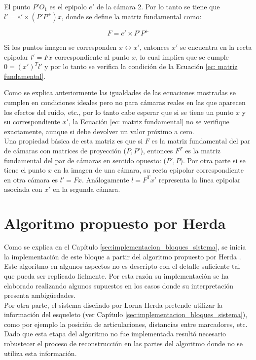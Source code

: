 El punto $P'O_1$ es el epipolo $e'$ de la cámara 2. Por lo tanto se tiene que\\$l' = e' \times (P'P^+) x$, donde se define la matriz fundamental como:

\begin{equation}
F=e' \times P'P^+
\end{equation}

Si los puntos imagen se corresponden $x \leftrightarrow x'$, entonces $x'$ se encuentra en la recta epipolar $l'=Fx$ correspondiente al punto $x$, lo cual implica que se cumple $0=(x')^Tl'$ y por lo tanto se verifica la condición de la Ecuación \ref{ec: matriz fundamental}. 

Como se explica anteriormente las igualdades de las ecuaciones mostradas se cumplen en condiciones ideales pero no para cámaras reales en las que aparecen los efectos del ruido, etc., por lo tanto cabe esperar que si se tiene un punto $x$ y su correspondiente $x'$, la Ecuación \ref{ec: matriz fundamental} no se verifique exactamente, aunque si debe devolver un valor próximo a cero.\\

Una propiedad básica de esta matriz es que si $F$ es la matriz fundamental del par de cámaras con matrices de proyección ($P,P'$), entonces $F^T$ es la matriz fundamental del par de cámaras en sentido opuesto: ($P',P$). Por otra parte si se tiene el punto $x$ en la imagen de una cámara, su recta epipolar correspondiente en otra cámara es $l'=Fx$. Análogamente $l=F^Tx'$ representa la línea epipolar asociada con $x'$ en la segunda cámara.

\section{Algoritmo propuesto por Herda }

Como se explica en el Capítulo \ref{sec:implementacion_bloques_sistema}, se inicia la implementación de este bloque a partir del algoritmo propuesto por Herda \cite{herda}. Este algoritmo en algunos aspectos no es descripto con el detalle suficiente tal que pueda ser replicado fielmente. Por esta razón su implementación se ha elaborado realizando algunos supuestos en los casos donde su interpretación presenta ambigüedades.\\

Por otra parte, el sistema diseñado por Lorna Herda pretende utilizar la información del esqueleto (ver Capítulo \ref{sec:implementacion_bloques_sistema}), como por ejemplo la posición de articulaciones, distancias entre marcadores, etc. Dado que esta etapa del algoritmo no fue implementada resultó necesario robustecer el proceso de reconstrucción en las partes del algoritmo donde no se utiliza esta información.\\


